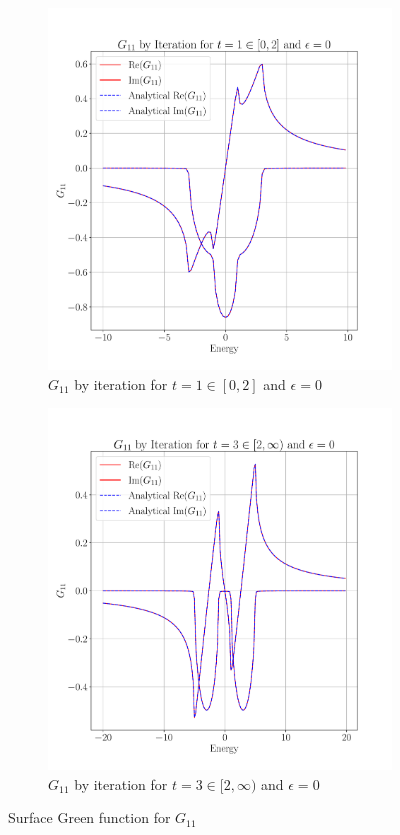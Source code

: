 \begin{figure}[htb!]
  \begin{subfigure}{.5\linewidth}
    \centering
    \includegraphics[width=\linewidth]{code/Double_Chain/plots/original.pdf}
    \caption{$G_{11}$ by iteration for $t=1 \in [0, 2]$ and
      $\epsilon = 0$}
  \end{subfigure}
  \begin{subfigure}{.5\linewidth}
    \centering
    \includegraphics[width=\linewidth]{code/Double_Chain/plots/higher_t.pdf}
    \caption{$G_{11}$ by iteration for $t=3 \in [2, \infty)$ and
      $\epsilon = 0$}
  \end{subfigure}
  \caption{Surface Green function for $G_{11}$}
  \label{fig:G11_original}
\end{figure}

